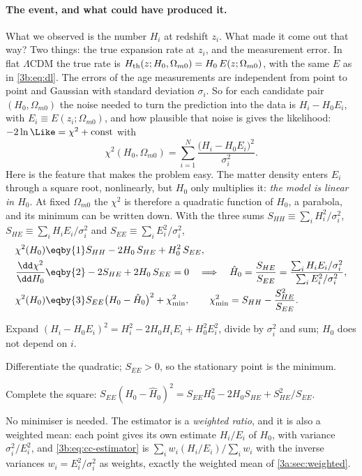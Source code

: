 \paragraph{The event, and what could have produced it.}
What we observed is the number $H_i$ at redshift $z_i$. What made it come out that way? Two
things: the true expansion rate at $z_i$, and the measurement error. In flat $\Lambda$CDM the
true rate is $H_{\rm th}(z;H_0,\Omega_{m0})=H_0\,E(z;\Omega_{m0})$, with the same $E$ as in
\eqref{3b:eq:dl}. The errors of the age measurements are independent from point to point and
Gaussian with standard deviation $\sigma_i$. So for each candidate pair $(H_0,\Omega_{m0})$ the
noise needed to turn the prediction into the data is $H_i-H_0E_i$, with $E_i\equiv E(z_i;\Omega_{m0})$,
and how plausible that noise is gives the likelihood: $-2\ln\Like=\chi^2+\text{const}$ with
\[
  \chi^2(H_0,\Omega_{m0})=\sum_{i=1}^{N}\frac{\bigl(H_i-H_0E_i\bigr)^2}{\sigma_i^2}.
\]
Here is the feature that makes the problem easy. The matter density enters $E_i$ through a
square root, nonlinearly, but $H_0$ only multiplies it: \emph{the model is linear in $H_0$}. At
fixed $\Omega_{m0}$ the $\chi^2$ is therefore a quadratic function of $H_0$, a parabola, and its
minimum can be written down. With the three sums $S_{HH}\equiv\sum_iH_i^2/\sigma_i^2$,
$S_{HE}\equiv\sum_iH_iE_i/\sigma_i^2$ and $S_{EE}\equiv\sum_iE_i^2/\sigma_i^2$,
\begin{align}
  \chi^2(H_0)
  &\eqby{1}S_{HH}-2H_0\,S_{HE}+H_0^2\,S_{EE},
  \nonumber\\
  \frac{\dd\chi^2}{\dd H_0}
  &\eqby{2}-2S_{HE}+2H_0\,S_{EE}=0
  \quad\Longrightarrow\quad
  \hat H_0=\frac{S_{HE}}{S_{EE}}=\frac{\sum_iH_iE_i/\sigma_i^2}{\sum_iE_i^2/\sigma_i^2},
  \label{3b:eq:cc-estimator}\\
  \chi^2(H_0)
  &\eqby{3}S_{EE}\bigl(H_0-\hat H_0\bigr)^2+\chi^2_{\min},
  \qquad \chi^2_{\min}=S_{HH}-\frac{S_{HE}^2}{S_{EE}} .
  \nonumber
\end{align}
\begin{explain}
  \item Expand $(H_i-H_0E_i)^2=H_i^2-2H_0H_iE_i+H_0^2E_i^2$, divide by $\sigma_i^2$ and sum;
        $H_0$ does not depend on $i$.
  \item Differentiate the quadratic; $S_{EE}>0$, so the stationary point is the minimum.
  \item Complete the square: $S_{EE}(H_0-\hat H_0)^2=S_{EE}H_0^2-2H_0S_{HE}+S_{HE}^2/S_{EE}$.
\end{explain}
No minimiser is needed. The estimator is a \emph{weighted ratio}, and it is also a weighted
mean: each point gives its own estimate $H_i/E_i$ of $H_0$, with variance $\sigma_i^2/E_i^2$,
and \eqref{3b:eq:cc-estimator} is $\sum_iw_i(H_i/E_i)/\sum_iw_i$ with the inverse variances
$w_i=E_i^2/\sigma_i^2$ as weights, exactly the weighted mean of \cref{3a:sec:weighted}.

